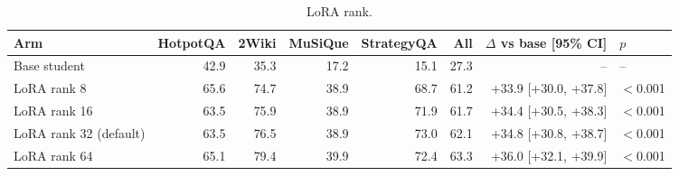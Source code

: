 \begin{table}[t]
\centering
\small
\caption{LoRA rank.}
\label{tab:E11-knobs}
\begin{tabular}{lrrrrrrl}
\toprule
Arm & HotpotQA & 2Wiki & MuSiQue & StrategyQA & All & $\Delta$ vs base [95\% CI] & $p$ \\
\midrule
Base student & 42.9 & 35.3 & 17.2 & 15.1 & 27.3 & -- & -- \\
LoRA rank 8 & 65.6 & 74.7 & 38.9 & 68.7 & 61.2 & +33.9 [+30.0, +37.8] & $<$0.001 \\
LoRA rank 16 & 63.5 & 75.9 & 38.9 & 71.9 & 61.7 & +34.4 [+30.5, +38.3] & $<$0.001 \\
LoRA rank 32 (default) & 63.5 & 76.5 & 38.9 & 73.0 & 62.1 & +34.8 [+30.8, +38.7] & $<$0.001 \\
LoRA rank 64 & 65.1 & 79.4 & 39.9 & 72.4 & 63.3 & +36.0 [+32.1, +39.9] & $<$0.001 \\
\bottomrule
\end{tabular}
\end{table}
